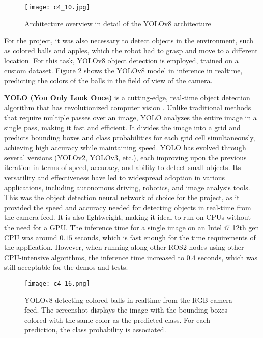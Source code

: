 \begin{figure}[H]
    \centering
    \texttt{[image: c4\_10.jpg]}
    \caption{Architecture overview in detail of the YOLOv8 architecture}
    \label{fig:yolov8}
\end{figure}

For the project, it was also necessary to detect objects in the environment, such as colored balls and apples, which the robot
had to grasp and move to a different location. For this task, YOLOv8 object detection is employed, trained
on a custom dataset. Figure \ref{fig:balls} shows the YOLOv8 model in inference
in realtime, predicting the colors of the balls in the field of view of the camera.

\textbf{YOLO (You Only Look Once)} is a cutting-edge, real-time object detection algorithm 
that has revolutionized computer vision \cite{redmon2015yolo}.
Unlike traditional methods that require multiple passes over an image, YOLO analyzes the entire image in a single pass,
making it fast and efficient. It divides the image into a grid and predicts bounding boxes and class probabilities
for each grid cell simultaneously, achieving high accuracy while maintaining speed. 
YOLO has evolved through several versions (YOLOv2, YOLOv3, etc.), each improving upon the previous iteration in terms of speed, 
accuracy, and ability to detect small objects. Its versatility and effectiveness have led to widespread adoption in various
applications, including autonomous driving, robotics, and image analysis tools. This was the object detection neural
network of choice for the project, as it provided the speed and accuracy needed for detecting objects in real-time
from the camera feed. It is also lightweight, making it ideal to run on CPUs without the need for a GPU.
The inference time for a single image on an Intel i7 12th gen CPU was around $0.15$ seconds, which is fast enough
for the time requirements of the application. However, when running along other ROS2 nodes using other CPU-intensive
algorithms, the inference time increased to $0.4$ seconds, which was still acceptable for the demos and tests.

\begin{figure}[H]
    \centering
    \texttt{[image: c4\_16.png]}
    \caption{YOLOv8 detecting colored balls in realtime from the RGB camera feed. The screenshot displays the image
    with the bounding boxes colored with the same color as the predicted class. For each prediction, the 
    class probability is associated.}
    \label{fig:balls}
\end{figure}

